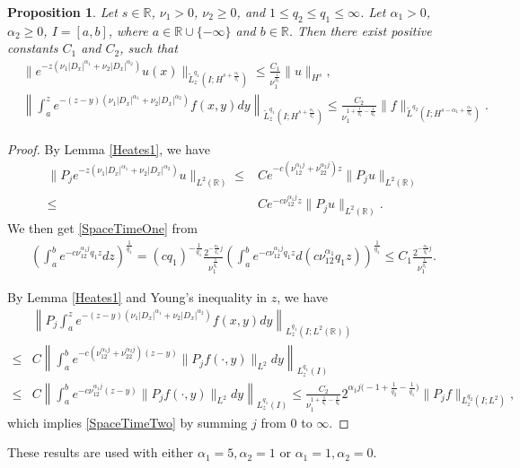 \documentclass[12pt]{amsart}
\newtheorem{proposition}[theorem]{Proposition}
\theoremstyle{definition}
\numberwithin{equation}{section}
\newcommand{\R}{\mathbb{R}}
\newcommand{\al}{\alpha}
\newcommand{\f}{\frac}
\begin{document}
\begin{proposition}
Let $s\in \R$, $\nu_1>0$, $\nu_2\geq0$, and $1\leq q_2 \leq q_1 \leq \infty$.
Let $\alpha_1>0$, $\alpha_2\geq0$, $I = [a,b]$, where $a\in \R \cup \{-\infty \}$ and $b\in \R$.
Then there exist positive constants $C_1$ and $C_2$, such that
\begin{align}
 &\|e^{-z(\nu_1  |D_x|^{\alpha_1}+\nu_2|D_x|^{\alpha_2})}u(x) \|_{\widetilde{L}^{q_1}_z(I; H^{s+\frac{\alpha_1}{q_1}})} \leq \frac{C_1}{\nu_1^{\frac{1}{q_1}}}\|u\|_{H^s},  \label{SpaceTimeOne}\\
 &\left\|\int_a^z e^{-(z-y)(\nu_1|D_x|^{\alpha_1}+\nu_2|D_x|^{\alpha_2})}f(x,y)dy \right\|_{\widetilde{L}^{q_1}_z(I; H^{s+\frac{\alpha_1}{q_1}})} \leq \frac{C_2}{\nu_1^{1+\frac{1}{q_1}-\frac{1}{q_2}}} \|f\|_{\widetilde{L}^{q_2}(I; H^{s-\alpha_1+\frac{\alpha_1}{q_2}})}. \label{SpaceTimeTwo}
\end{align}
\end{proposition}
\begin{proof}
By Lemma \ref{Heates1}, we have
\begin{align*}
\|P_je^{-z(\nu_1  |D_x|^{\alpha_1}+\nu_2|D_x|^{\alpha_2})}u\|_{L^2(\R)}\leq& C e^{-c (\nu_12^{\alpha_1 j}+\nu_22^{\al_2j} )z} \|P_j u\|_{L^2(\R)}\\
\leq& C e^{-c \nu_12^{\alpha_1 j}z} \|P_j u\|_{L^2(\R)}.
\end{align*}
We then  get \eqref{SpaceTimeOne} from
\begin{align*}
\left(\int_{a}^be^{-c \nu_12^{\alpha_1j}q_1z}dz\right)^{\f{1}{q_1}}
=(cq_1)^{-\f{1}{q_1}}\f{2^{-\f{\al_1}{q_1} j}}{\nu_1^{\f1{q_1}}}\left(\int_a^be^{-c \nu_12^{\alpha_1j}q_1z}d(c\nu_12^{\al_1}q_1z)\right)^{\f1{q_1}}\leq C_1\f{2^{-\f{\al_1}{q_1} j}}{\nu_1^{\f1{q_1}}}.
\end{align*}

By Lemma \ref{Heates1} and Young's inequality in $z$, we have
\begin{align*}
&\left\|P_j\int_a^z e^{-(z-y)(\nu_1|D_x|^{\alpha_1}+\nu_2|D_x|^{\alpha_2})}f(x,y)dy \right\|_{L^{q_1}_z(I; L^2(\R))}\\
\leq& C\left\|\int_a^b e^{-c (\nu_12^{\alpha_1 j}+\nu_22^{\al_2j} )(z-y)}\|P_jf(\cdot,y)\|_{L^2}dy \right\|_{L^{q_1}_z(I)}\\
\leq& C\left\|\int_a^b e^{-c\nu_12^{\alpha_1 j}(z-y)}\|P_jf(\cdot,y)\|_{L^2}dy \right\|_{L^{q_1}_z(I)} \leq \f{C_2}{\nu_1^{1+\f1{q_1}-\f{1}{q_2}}}2^{\al_1j\big(-1+\f1{q_2}-\f{1}{q_1}\big)}\|P_jf\|_{L^{q_2}_z(I;L^2)},
\end{align*}
which implies \eqref{SpaceTimeTwo} by summing $j$ from $0$ to $\infty$.
\end{proof}
These results are used with either $\alpha_1 = 5, \alpha_2 = 1$ or $\alpha_1 = 1, \alpha_2 = 0$.
\end{document}
